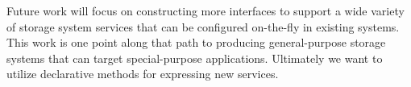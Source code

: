 \documentclass[preprint]{sigplanconf-eurosys}
\begin{document}
Future work will focus on constructing more interfaces to support a wide
variety of storage system services that can be configured on-the-fly in existing
systems. This work is one point along that path to producing general-purpose
storage systems that can
target  special-purpose applications.  Ultimately we want to utilize
declarative methods for expressing new services.



\end{document}
